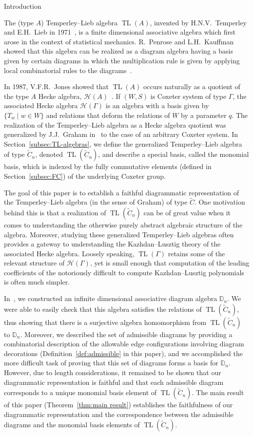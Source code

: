 \documentclass[11pt]{amsart}
\theoremstyle{definition}
\numberwithin{equation}{section}
\newcommand{\C}{\widetilde{C}}
\DeclareMathOperator{\TL}{TL}
\newcommand{\D}{\mathbb{D}}
\renewcommand{\(}{\left(}
\renewcommand{\)}{\right)}
\renewcommand{\H}{\mathcal{H}}
\begin{document}
\begin{section}{Introduction}\label{sec:intro}

The (type $A$) Temperley--Lieb algebra $\TL(A)$, invented by H.N.V.~Temperley and E.H.~Lieb in 1971~\cite{Temperley1971}, is a finite dimensional associative algebra which first arose in the context of statistical mechanics.  R.~Penrose and L.H.~Kauffman showed that this algebra can be realized as a diagram algebra having a basis given by certain diagrams in which the multiplication rule is given by applying local combinatorial rules to the diagrams~\cite{Kauffman1987, Penrose1971}.

In 1987, V.F.R.~Jones showed that $\TL(A)$ occurs naturally as a quotient of the type $A$ Hecke algebra, $\H(A)$~\cite{Jones1999}.  If $(W,S)$ is Coxeter system of type $\Gamma$, the associated Hecke algebra $\H(\Gamma)$ is an algebra with a basis given by $\{T_w\mid w \in W\}$ and relations that deform the relations of $W$ by a parameter $q$. The realization of the Temperley--Lieb algebra as a Hecke algebra quotient was generalized by J.J.~Graham in~\cite{Graham1995} to the case of an arbitrary Coxeter system.  In Section~\ref{subsec:TL-algebras}, we define the generalized Temperley--Lieb algebra of type $\C_{n}$, denoted $\TL(\C_{n})$, and describe a special basis, called the monomial basis, which is indexed by the fully commutative elements (defined in Section~\ref{subsec:FC}) of the underlying Coxeter group.

The goal of this paper is to establish a faithful diagrammatic representation of the Tem\-per\-ley--Lieb algebra (in the sense of Graham) of type $\C$.  One motivation behind this is that a realization of $\TL(\C_n)$ can be of great value when it comes to understanding the otherwise purely abstract algebraic structure of the algebra.  Moreover, studying these generalized Temperley--Lieb algebras often provides a gateway to understanding the Kazhdan--Lusztig theory of the associated Hecke algebra.  Loosely speaking, $\TL(\Gamma)$ retains some of the relevant structure of $\H(\Gamma)$, yet is small enough that computation of the leading coefficients of the notoriously difficult to compute Kazhdan--Lusztig polynomials is often much simpler.

In~\cite{Ernst2012}, we constructed an infinite dimensional associative diagram algebra $\D_n$.  We were able to easily check that this algebra satisfies the relations of $\TL(\C_n)$, thus showing that there is a surjective algebra homomorphism from $\TL(\C_n)$ to $\D_n$.  Moreover, we described the set of admissible diagrams by providing a combinatorial description of the allowable edge configurations involving diagram decorations (Definition~\ref{def:admissible} in this paper), and we accomplished the more difficult task of proving that this set of diagrams forms a basis for $\D_n$.  However, due to length considerations, it remained to be shown that our diagrammatic representation is faithful and that each admissible diagram corresponds to a unique monomial basis element of $\TL(\C_n)$.  The main result of this paper (Theorem~\ref{thm:main result}) establishes the faithfulness of our diagrammatic representation and the correspondence between the admissible diagrams and the monomial basis elements of $\TL(\C_n)$.


\end{section}
\end{document}
